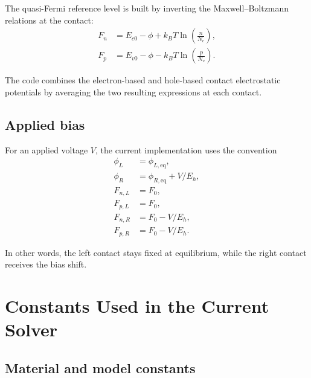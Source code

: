 \documentclass[11pt]{article}
\begin{document}
The quasi-Fermi reference level is built by inverting the Maxwell--Boltzmann
relations at the contact:
\begin{align}
    F_n &= E_{c0} - \phi + k_B T \ln\!\left(\frac{n}{N_c}\right), \\
    F_p &= E_{v0} - \phi - k_B T \ln\!\left(\frac{p}{N_v}\right).
\end{align}

The code combines the electron-based and hole-based contact electrostatic
potentials by averaging the two resulting expressions at each contact.

\subsection{Applied bias}

For an applied voltage $V$, the current implementation uses the convention
\begin{align}
    \phi_L &= \phi_{L,\mathrm{eq}}, \\
    \phi_R &= \phi_{R,\mathrm{eq}} + V/E_h, \\
    F_{n,L} &= F_0, \\
    F_{p,L} &= F_0, \\
    F_{n,R} &= F_0 - V/E_h, \\
    F_{p,R} &= F_0 - V/E_h.
\end{align}

In other words, the left contact stays fixed at equilibrium, while the right
contact receives the bias shift.

\section{Constants Used in the Current Solver}

\subsection{Material and model constants}
\end{document}
